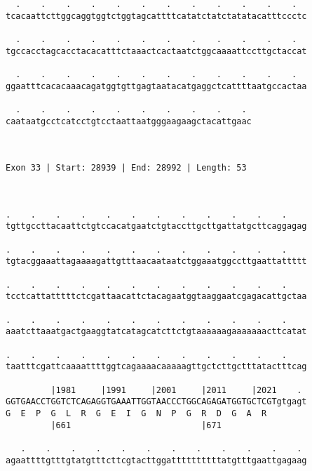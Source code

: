\documentclass{article}
\begin{document}
\begin{Verbatim}
  .    .    .    .    .    .    .    .    .    .    .    .  
tcacaattcttggcaggtggtctggtagcattttcatatctatctatatacatttccctc
                                                            
  .    .    .    .    .    .    .    .    .    .    .    .  
tgccacctagcacctacacatttctaaactcactaatctggcaaaattccttgctaccat
                                                            
  .    .    .    .    .    .    .    .    .    .    .    .  
ggaatttcacacaaacagatggtgttgagtaatacatgaggctcattttaatgccactaa
                                                            
  .    .    .    .    .    .    .    .    .    . 
caataatgcctcatcctgtcctaattaatgggaagaagctacattgaac
                                                 
                                                 
 
Exon 33 | Start: 28939 | End: 28992 | Length: 53



.    .    .    .    .    .    .    .    .    .    .    .    
tgttgccttacaattctgtccacatgaatctgtaccttgcttgattatgcttcaggagag
                                                            
.    .    .    .    .    .    .    .    .    .    .    .    
tgtacggaaattagaaaagattgtttaacaataatctggaaatggccttgaattattttt
                                                            
.    .    .    .    .    .    .    .    .    .    .    .    
tcctcattatttttctcgattaacattctacagaatggtaaggaatcgagacattgctaa
                                                            
.    .    .    .    .    .    .    .    .    .    .    .    
aaatcttaaatgactgaaggtatcatagcatcttctgtaaaaaagaaaaaaacttcatat
                                                            
.    .    .    .    .    .    .    .    .    .    .    .    
taatttcgattcaaaattttggtcagaaaacaaaaagttgctcttgctttatactttcag
                                                            
         |1981     |1991     |2001     |2011     |2021    . 
GGTGAACCTGGTCTCAGAGGTGAAATTGGTAACCCTGGCAGAGATGGTGCTCGTgtgagt
G  E  P  G  L  R  G  E  I  G  N  P  G  R  D  G  A  R        
         |661                          |671                 
  
   .    .    .    .    .    .    .    .    .    .    .    . 
agaattttgtttgtatgtttcttcgtacttggattttttttttatgtttgaattgagaag
                                                            

\end{Verbatim}
\end{document}
